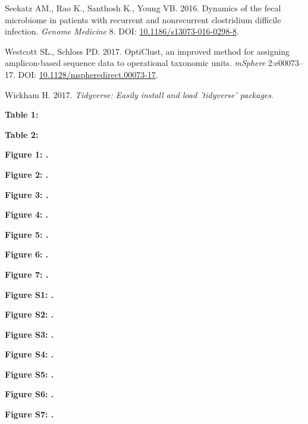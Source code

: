 \documentclass[12pt,]{article}
\begin{document}
\hypertarget{ref-erin_seekatz_2016}{}
Seekatz AM., Rao K., Santhosh K., Young VB. 2016. Dynamics of the fecal
microbiome in patients with recurrent and nonrecurrent clostridium
difficile infection. \emph{Genome Medicine} 8. DOI:
\href{https://doi.org/10.1186/s13073-016-0298-8}{10.1186/s13073-016-0298-8}.

\hypertarget{ref-opticlust_Westcott_2017}{}
Westcott SL., Schloss PD. 2017. OptiClust, an improved method for
assigning amplicon-based sequence data to operational taxonomic units.
\emph{mSphere} 2:e00073--17. DOI:
\href{https://doi.org/10.1128/mspheredirect.00073-17}{10.1128/mspheredirect.00073-17}.

\hypertarget{ref-tidyverse_2017}{}
Wickham H. 2017. \emph{Tidyverse: Easily install and load 'tidyverse'
packages}.

\newpage

\textbf{Table 1: }

\footnotesize

\normalsize
\newpage

\textbf{Table 2: }

\footnotesize

\normalsize
\newpage

\textbf{Figure 1: .}

\textbf{Figure 2: .}

\textbf{Figure 3: .}

\textbf{Figure 4: .}

\textbf{Figure 5: .}

\textbf{Figure 6: .}

\textbf{Figure 7: .}

\newpage

\textbf{Figure S1: .}

\textbf{Figure S2: .}

\textbf{Figure S3: .}

\textbf{Figure S4: .}

\textbf{Figure S5: .}

\textbf{Figure S6: .}

\textbf{Figure S7: .}

\newpage
\end{document}
